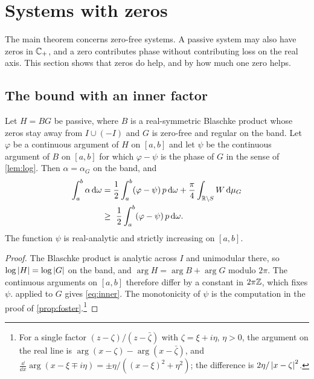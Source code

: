 \section{Systems with zeros}\label{sec:zeros}

The main theorem concerns zero-free systems. A passive system may also have
zeros in $\mathbb C_{+}$, and a zero contributes phase without contributing loss on
the real axis. This section shows that zeros do help, and by how much one
zero helps.

\subsection{The bound with an inner factor}

\begin{proposition}\label{prop:inner}
Let $H=BG$ be passive, where $B$ is a real-symmetric Blaschke product whose
zeros stay away from $I\cup(-I)$ and $G$ is zero-free and regular on the
band. Let $\varphi$ be a continuous argument of $H$ on $[a,b]$ and let $\psi$
be the continuous argument of $B$ on $[a,b]$ for which $\varphi-\psi$ is the
phase of $G$ in the sense of \cref{lem:log}. Then $\alpha=\alpha_G$ on the
band, and
\begin{equation}\label{eq:inner}
\begin{aligned}
\int_a^b\alpha\,\mathrm d\omega&=\frac12\int_a^b(\varphi-\psi)\,p\,\mathrm d\omega
+\frac\pi4\int_{\mathbb R\setminus S}W\,\mathrm d\mu_G\\
&\ge\ \frac12\int_a^b(\varphi-\psi)\,p\,\mathrm d\omega .
\end{aligned}
\end{equation}
The function $\psi$ is real-analytic and strictly increasing on $[a,b]$.
\end{proposition}

\begin{proof}
The Blaschke product is analytic across $I$ and unimodular there, so
$\log\left|H\right|=\log\left|G\right|$ on the band, and $\arg H=\arg B+\arg G$ modulo $2\pi$.
The continuous arguments on $[a,b]$ therefore differ by a constant in
$2\pi\mathbb Z$, which fixes $\psi$.  applied to $G$ gives
\eqref{eq:inner}. The monotonicity of $\psi$ is the computation in the
proof of \cref{prop:foster}.\footnote{For a single factor
$(z-\zeta)/(z-\bar\zeta)$ with $\zeta=\xi+i\eta$, $\eta>0$, the argument on the
real line is $\arg(x-\zeta)-\arg(x-\bar\zeta)$, and
$\frac{\dd}{\dd x}\arg(x-\xi\mp i\eta)=\pm\eta/((x-\xi)^2+\eta^2)$; the
difference is $2\eta/\left|x-\zeta\right|^2$.}
\end{proof}

